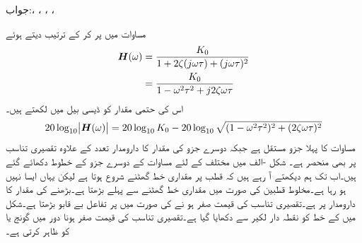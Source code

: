 جواب:، ، ، ،\\

مساوات  میں  پر کر کے ترتیب دیتے ہوئے
\begin{align*}
{\ensuremath{{\boldsymbol{H}}}}(\omega)&=\frac{K_0}{1+2\zeta (j\omega \tau)+(j\omega \tau)^2}\\
&=\frac{K_0}{1-\omega^2\tau^2 +j 2\zeta\omega \tau}
\end{align*}
اس کی حتمی مقدار کو ڈیسی بیل میں لکھتے ہیں۔
\begin{align}\label{مساوات_تعددی_تقصیری_جزو}
20\log_{10}\abs{{{\boldsymbol{H}}}(\omega)}=20\log_{10} K_0 -20\log_{10}\sqrt{(1- \omega^2\tau^2)^2+(2\zeta\omega\tau)^2}
\end{align}
مساوات  کا پہلا جزو مستقل ہے جبکہ دوسرے جزو کی مقدار کا دارومدار تعدد کے علاوہ تقصیری تناسب پر بھی منحصر  ہے۔ شکل -الف میں مختلف  کے  لئے مساوات  کے  دوسرے جزو کے خطوط دکھائے گئے ہیں۔اب تک ہم دیکھتے آ رہے ہیں کہ قطب پر مقداری خط گھٹنے شروع ہوتا ہے لیکن یہاں ایسا نہیں ہو رہا ہے۔مخلوط قطبین کی صورت میں مقداری خط گھٹنے سے پہلے بڑھتا ہے۔بڑھنے کی مقدار کا دارومدار  پر ہے۔تقصیری تناسب کی قیمت صفر  ہو نے کی صورت میں  پر تفاعل بے قابو بڑھتا ہے۔شکل میں  کے خط کو نقطہ دار لکیر سے دکھایا گیا ہے۔تقصیری تناسب کی قیمت صفر ہونا دور میں گونج یا  کو ظاہر کرتی ہے۔

